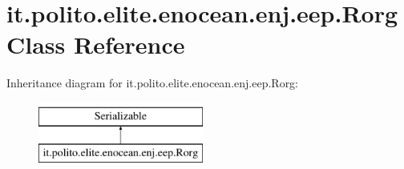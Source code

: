 \hypertarget{classit_1_1polito_1_1elite_1_1enocean_1_1enj_1_1eep_1_1_rorg}{}\section{it.\+polito.\+elite.\+enocean.\+enj.\+eep.\+Rorg Class Reference}
\label{classit_1_1polito_1_1elite_1_1enocean_1_1enj_1_1eep_1_1_rorg}
Inheritance diagram for it.\+polito.\+elite.\+enocean.\+enj.\+eep.\+Rorg\+:\begin{figure}[H]
\begin{center}
\leavevmode
\includegraphics[height=2.000000cm]{classit_1_1polito_1_1elite_1_1enocean_1_1enj_1_1eep_1_1_rorg}
\end{center}
\end{figure}
